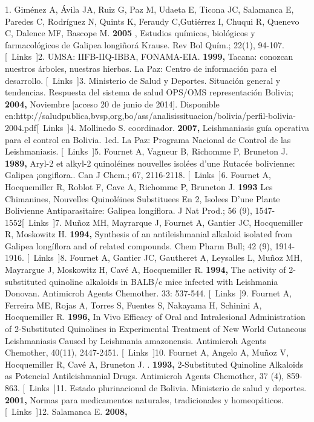 \documentclass{article}
\begin{document}
1. Giménez A, Ávila JA, Ruiz G, Paz M, Udaeta E, Ticona JC, Salamanca E, Paredes C, Rodríguez N, Quints K, Feraudy C,Gutiérrez I, Chuqui R, Quenevo C, Dalence MF, Bascope M. \textbf{2005}
, Estudios químicos, biológicos y farmacológicos de Galipea longiñorá Krause. Rev Bol Quím.; 22(1), 94-107.    [ Links ]2. UMSA: IIFB-IIQ-IBBA, FONAMA-EIA. \textbf{1999, }
Tacana: conozcan nuestros árboles, nuestras hierbas. La Paz: Centro de información para el desarrollo.    [ Links ]3. Ministerio de Salud y Deportes. Situación general y tendencias. Respuesta del sistema de salud OPS/OMS representación Bolivia; \textbf{2004, }
Noviembre [acceso 20 de junio de 2014]. Disponible en:http://saludpublica,bvsp,org,bo/ass/analisissituacion/bolivia/perfil-bolivia-2004.pdf[ Links ]4.  Mollinedo S. coordinador. \textbf{2007, }
Leishmaniasis guía operativa para el control en Bolivia. 1ed. La Paz: Programa Nacional de Control de las Leishmaniasis.    [ Links ]5.  Fournet A, Vagneur B, Richomme P, Bruneton J. \textbf{1989, }
Aryl-2 et alkyl-2 quinoléines nouvelles isolées d'une Rutacée bolivienne: Galipea ¡ongiflora.. Can J Chem.; 67, 2116-2118.    [ Links ]6. Fournet A, Hocquemiller R, Roblot F, Cave A, Richomme P, Bruneton J. \textbf{1993 }
Les Chimanines, Nouvelles Quinoléines Substituees En 2, Isolees D'une Plante Bolivienne Antiparasitaire: Galipea longíflora. J Nat Prod.; 56 (9), 1547-1552[ Links ]7. Muñoz MH, Mayrarque J, Fournet A, Gantier JC, Hocquemiller R, Moskowitz H. \textbf{1994, }
Synthesis of an antileishmanial alkaloid isolated from Galipea longíflora and of related compounds. Chem Pharm Bull; 42 (9), 1914-1916.    [ Links ]8. Fournet A, Gantier JC, Gautheret A, Leysalles L, Muñoz MH, Mayrargue J, Moskowitz H, Cavé A, Hocquemiller R. \textbf{1994, }
The activity of 2-substituted quinoline alkaloids in BALB/c mice infected with Leishmania Donovan. Antimicroh Agents Chemother. 33: 537-544.    [ Links ]9. Fournet A, Ferreira ME, Rojas A, Torres S, Fuentes S, Nakayama H, Schinini A, Hocquemiller R. \textbf{1996, }
In Vivo Efficacy of Oral and Intralesional Administration of 2-Substituted Quinolines in Experimental Treatment of New World Cutaneous Leishmaniasis Caused by Leishmania amazonensis. Antimicroh Agents Chemother, 40(11), 2447-2451.    [ Links ]10. Fournet A, Angelo A, Muñoz V, Hocquemiller R, Cavé A, Bruneton J. . \textbf{1993, }
2-Substituted Quinoline Alkaloids as Potencial Antileishmanial Drugs. Antimicroh Agents Chemother, 37 (4), 859-863.    [ Links ]11. Estado plurinacional de Bolivia. Ministerio de salud y deportes. \textbf{2001, }
Normas para medicamentos naturales, tradicionales y homeopáticos.    [ Links ]12. Salamanca E. \textbf{2008, }
\end{document}
